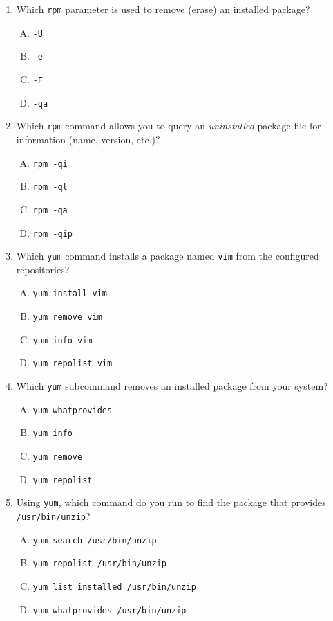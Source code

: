 \documentclass[a4paper]{report}
\begin{document}
\begin{enumerate}[1.]

    \item Which \texttt{rpm} parameter is used to remove (erase) an installed package?  
    \begin{enumerate}[A)]
        \item \texttt{-U}  
        \item \texttt{-e}  
        \item \texttt{-F}  
        \item \texttt{-qa}  
    \end{enumerate}

    \item Which \texttt{rpm} command allows you to query an \emph{uninstalled} package file for information (name, version, etc.)?  
    \begin{enumerate}[A)]
        \item \texttt{rpm -qi}  
        \item \texttt{rpm -ql}  
        \item \texttt{rpm -qa}  
        \item \texttt{rpm -qip}  
    \end{enumerate}

    \item Which \texttt{yum} command installs a package named \texttt{vim} from the configured repositories?  
    \begin{enumerate}[A)]
        \item \texttt{yum install vim}  
        \item \texttt{yum remove vim}  
        \item \texttt{yum info vim}  
        \item \texttt{yum repolist vim}  
    \end{enumerate}

    \item Which \texttt{yum} subcommand removes an installed package from your system?  
    \begin{enumerate}[A)]
        \item \texttt{yum whatprovides}  
        \item \texttt{yum info}  
        \item \texttt{yum remove}  
        \item \texttt{yum repolist}  
    \end{enumerate}

    \item Using \texttt{yum}, which command do you run to find the package that provides \texttt{/usr/bin/unzip}?  
    \begin{enumerate}[A)]
        \item \texttt{yum search /usr/bin/unzip}  
        \item \texttt{yum repolist /usr/bin/unzip}  
        \item \texttt{yum list installed /usr/bin/unzip}  
        \item \texttt{yum whatprovides /usr/bin/unzip}  
    \end{enumerate}


\end{enumerate}
\end{document}
